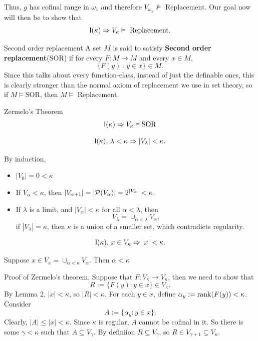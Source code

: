 \documentclass{article}
\begin{document}
Thus, $g$ has cofinal range in $\omega_{1}$ and therefore $V_{\omega_{n}} \nvDash \text{ Replacement}$.\gap 
Our goal now will then be to show that \[ \mathsf{I}(\kappa) \Rightarrow V_{\kappa} \vDash \text{ Replacement}.\]
\begin{fancydefine}{Second order replacement}
    A set $M$ is said to satisfy \textbf{Second order replacement}(SOR) if for every $F : M \to M$ and every $x \in M$,\[ \{ F(y) \, : \, y \in x\} \in M.\]
    Since this talks about every function-class, instead of just the definable ones, this is clearly stronger than the normal axiom of replacement we use in set theory, so if $M \models \text{SOR}$, then $M \models \text{ Replacement}$.
\end{fancydefine}
\begin{fancythm}{Zermelo's Theorem}
    \[\mathsf{I}(\kappa) \Rightarrow V_{\kappa} \vDash \text{SOR}\]
\end{fancythm}
\begin{fancylem}{}
    \[\mathsf{I}(\kappa),\, \lambda < \kappa \Rightarrow |V_{\lambda}| < \kappa.\]
\end{fancylem}
\proof By induction, \begin{itemize}
    \item $|V_{0}|=0 < \kappa$
    \item If $V_{\alpha} < \kappa$, then $|V_{\alpha+1}| = |\mathcal{P}(V_{\alpha})| = 2^{|V_{\alpha}|} < \kappa$.
    \item If $\lambda$ is a limit, and $|V_{\alpha}| < \kappa$ for all $\alpha < \lambda$, then \[ V_{\lambda} = \cup_{\alpha < \lambda} V_{\alpha},\] if $|V_{\lambda}|=\kappa$, then $\kappa$ is a union of a smaller set, which contradicts regularity.
\end{itemize}
\endproof 
\begin{fancylem}{}
    \[ \mathsf{I}(\kappa),\, x \in V_{\kappa} \Rightarrow |x| < \kappa.\]
\end{fancylem}
Suppose $x \in V_{\kappa} = \cup_{\alpha < \kappa} V_{\alpha}.$ Then $\alpha < \kappa$

\proof Proof of Zermelo's theorem. Suppose that $F : V_{\kappa} \to V_{\kappa}$, then we need to show that \[ R := \{F(y) : y \in x\} \in V_{\kappa}.\]
By Lemma 2, $|x|<\kappa$, so $|R|<\kappa$. For each $y \in x$, define $\alpha_{y} := \rank(F(y)) < \kappa$. Consider \[ A:= \{ \alpha_{y} : y \in x\}.\] Clearly, $|A| \leq |x| < \kappa$. Since $\kappa$ is regular, $A$ cannot be cofinal in it. So there is some $\gamma < \kappa$ such that $A \subseteq V_{\gamma}$. By definiion $R \subseteq V_{\gamma}$, so $R \in V_{\gamma+1} \subseteq V_{\kappa}$.
\endproof
\end{document}

